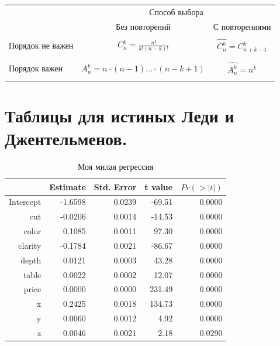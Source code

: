 \documentclass[12pt, a4paper]{article}
\begin{document}
\begin{center}
\begin{tabular}{ |l|c|c| }
\hline
 & \multicolumn{2}{c|}{Способ выбора} \\
\cline{2-3}
 & Без повторений & С повторениями  \\ \hline
\multirow{3}{*}{Порядок не важен}
                & & \\
                & $ C_n^{k} = \frac{n!}{k!(n-k)!} $ & $ \hat{C_n^k} = C_{n+k-1}^k $ \\
                & & \\

\hline
\multirow{3}{*}{Порядок важен}
               & & \\
               & $ A_n^{k} = n \cdot (n-1) \ldots \cdot (n-k+1) $ & $ \hat{A_n^k} = n^k $ \\
               & & \\
\hline
\end{tabular}
\end{center}


\section{Таблицы для истиных Леди и Джентельменов.}

\begin{table}[H]
\centering
\begin{tabular}{@{}rrrrr@{}}
\toprule
& Estimate & Std. Error & t value & $Pr( > | t |)$ \\
\midrule
Intercept & -1.6598 & 0.0239 & -69.51 & 0.0000 \\
cut & -0.0206 & 0.0014 & -14.53 & 0.0000 \\
color & 0.1085 & 0.0011 & 97.30 & 0.0000 \\
clarity & -0.1784 & 0.0021 & -86.67 & 0.0000 \\
depth & 0.0121 & 0.0003 & 43.28 & 0.0000 \\
table & 0.0022 & 0.0002 & 12.07 & 0.0000 \\
price & 0.0000 & 0.0000 & 231.49 & 0.0000 \\
x & 0.2425 & 0.0018 & 134.73 & 0.0000 \\
y & 0.0060 & 0.0012 & 4.92 & 0.0000 \\
z & 0.0046 & 0.0021 & 2.18 & 0.0290 \\
\bottomrule
\end{tabular}
\caption{Моя милая регрессия}
\end{table}
\end{document}
